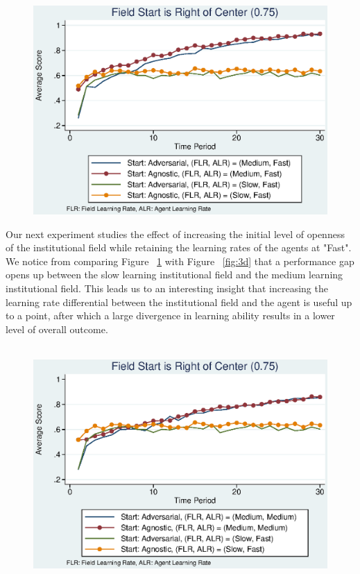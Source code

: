 \documentclass[12pt]{article}
\begin{document}
\begin{figure}[h]
\begin{centering}
  \includegraphics[width=\textwidth]{frcmedium3e}
  \caption{}
  \label{fig:3e}
\end{centering}
\end{figure}

\noindent Our next experiment studies the effect of increasing the initial level of openness of the institutional field while retaining the learning rates of the agents at "Fast". We notice from comparing Figure ~\ref{fig:3e} with Figure ~\ref{fig:3d} that a performance gap opens up between the slow learning institutional field and the medium learning institutional field. This leads us to an interesting insight that increasing the learning rate differential between the institutional field and the agent is useful up to a point, after which a large divergence in learning ability results in a lower level of overall outcome.\\\\
\begin{figure}[h]
\begin{centering}
  \includegraphics[width=\textwidth]{frcmedium3f}
  \caption{}
  \label{fig:3f}
\end{centering}
\end{figure}
\end{document}

